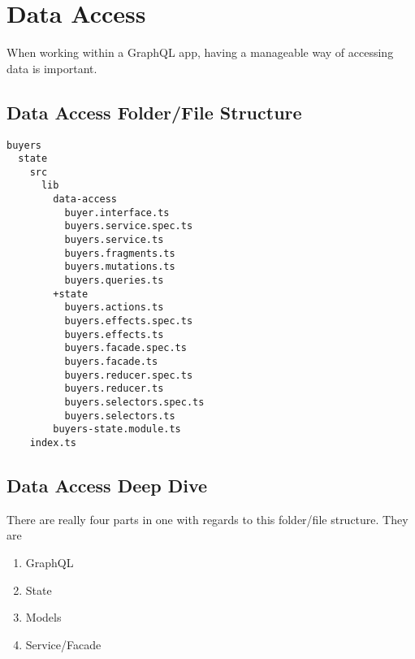 \maketitle{}
\section{ Data Access }
When working within a GraphQL app, having a manageable way of accessing data
is important.

\subsection{ Data Access Folder/File Structure}
\begin{verbatim}
buyers
  state
    src
      lib
        data-access
          buyer.interface.ts
          buyers.service.spec.ts
          buyers.service.ts
          buyers.fragments.ts
          buyers.mutations.ts
          buyers.queries.ts
        +state
          buyers.actions.ts
          buyers.effects.spec.ts
          buyers.effects.ts
          buyers.facade.spec.ts
          buyers.facade.ts
          buyers.reducer.spec.ts
          buyers.reducer.ts
          buyers.selectors.spec.ts
          buyers.selectors.ts
        buyers-state.module.ts
    index.ts
\end{verbatim}
\subsection{ Data Access Deep Dive}
There are really four parts in one with regards to this folder/file structure.
They are
\begin{enumerate}
  \item GraphQL
  \item State
  \item Models
  \item Service/Facade
\end{enumerate}
